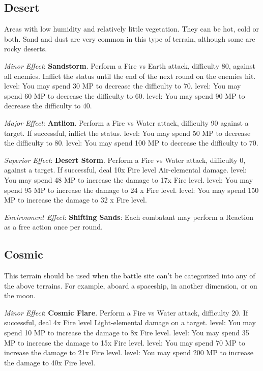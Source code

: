 \begin{multicols}{2}
\subsection*{Desert}\label{subsec:geo-desert}
Areas with low humidity and relatively little vegetation. They can be hot, cold or both. Sand and dust are very common in this type of terrain, although some are rocky deserts.

\textit{Minor Effect}: \textbf{Sandstorm}. Perform a Fire vs Earth attack, difficulty 80, against all enemies. Inflict the  status until the end of the next round on the enemies hit. level: You may spend 30 MP to decrease the difficulty to 70.  level: You may spend 60 MP to decrease the difficulty to 60.  level: You may spend 90 MP to decrease the difficulty to 40.

\textit{Major Effect}: \textbf{Antlion}. Perform a Fire vs Water attack, difficulty 90 against a target. If successful, inflict the  status\@.  level: You may spend 50 MP to decrease the difficulty to 80.  level: You may spend 100 MP to decrease the difficulty to 70.

\textit{Superior Effect}: \textbf{Desert Storm}. Perform a Fire vs Water attack, difficulty 0, against a target. If successful, deal 10x Fire level Air-elemental damage.  level: You may spend 48 MP to increase the damage to 17x Fire level.  level: You may spend 95 MP to increase the damage to 24 x Fire level.  level: You may spend 150 MP to increase the damage to 32 x Fire level.

\textit{Environment Effect}: \textbf{Shifting Sands}: Each combatant may perform a Reaction as a free action once per round.

\subsection*{Cosmic}\label{subsec:geo-cosmic}
This terrain should be used when the battle site can’t be categorized into any of the above terrains. For example, aboard a spaceship, in another dimension, or on the moon.

\textit{Minor Effect}: \textbf{Cosmic Flare}. Perform a Fire vs Water attack, difficulty 20. If successful, deal 4x Fire level Light-elemental damage on a target.  level: You may spend 10 MP to increase the damage to 8x Fire level.  level: You may spend 35 MP to increase the damage to 15x Fire level.  level: You may spend 70 MP to increase the damage to 21x Fire level.  level: You may spend 200 MP to increase the damage to 40x Fire level.


\end{multicols}
